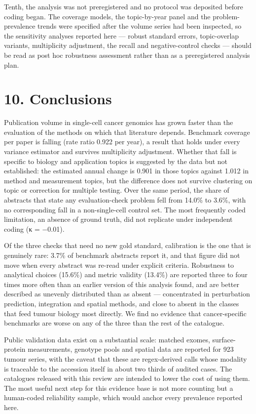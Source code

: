 \documentclass{article}
\begin{document}
Tenth, the analysis was not preregistered and no protocol was deposited
before coding began. The coverage models, the topic-by-year panel and
the problem-prevalence trends were specified after the volume series had
been inspected, so the sensitivity analyses reported here --- robust
standard errors, topic-overlap variants, multiplicity adjustment, the
recall and negative-control checks --- should be read as post hoc
robustness assessment rather than as a preregistered analysis plan.

\section{10. Conclusions}\label{conclusions}

Publication volume in single-cell cancer genomics has grown faster than
the evaluation of the methods on which that literature depends.
Benchmark coverage per paper is falling (rate ratio 0.922 per year), a
result that holds under every variance estimator and survives
multiplicity adjustment. Whether that fall is specific to biology and
application topics is suggested by the data but not established: the
estimated annual change is 0.901 in those topics against 1.012 in method
and measurement topics, but the difference does not survive clustering
on topic or correction for multiple testing. Over the same period, the
share of abstracts that state any evaluation-check problem fell from
14.0\% to 3.6\%, with no corresponding fall in a non-single-cell control
set. The most frequently coded limitation, an absence of ground truth,
did not replicate under independent coding (κ = −0.01).

Of the three checks that need no new gold standard, calibration is the
one that is genuinely rare: 3.7\% of benchmark abstracts report it, and
that figure did not move when every abstract was re-read under explicit
criteria. Robustness to analytical choices (15.6\%) and metric validity
(13.4\%) are reported three to four times more often than an earlier
version of this analysis found, and are better described as unevenly
distributed than as absent --- concentrated in perturbation prediction,
integration and spatial methods, and close to absent in the classes that
feed tumour biology most directly. We find no evidence that
cancer-specific benchmarks are worse on any of the three than the rest
of the catalogue.

Public validation data exist on a substantial scale: matched exomes,
surface-protein measurements, genotype pools and spatial data are
reported for 923 tumour series, with the caveat that these are
regex-derived calls whose modality is traceable to the accession itself
in about two thirds of audited cases. The catalogues released with this
review are intended to lower the cost of using them. The most useful
next step for this evidence base is not more counting but a human-coded
reliability sample, which would anchor every prevalence reported here.
\end{document}
